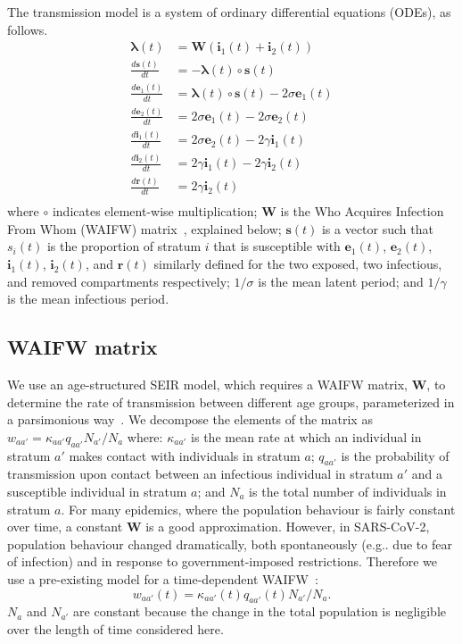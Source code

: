 \documentclass[9pt,twocolumn,twoside]{pnas-new}
\makeatletter
\newcommand\matr{\bm}
\renewcommand{\vec}[1]{\bm{#1}}
\DeclareRobustCommand\onedot{\futurelet\@let@token\@onedot}
\def\@onedot{\ifx\@let@token.\else.\null\fi\xspace}
\def\eg{e.g\onedot} \def\Eg{{E.g}\onedot}
\makeatother
\begin{document}
The transmission model is a system of ordinary differential equations (ODEs), as follows.
\begin{equation}
\begin{aligned}
    \vec{\lambda}(t) &= \matr{W} (\vec{i}_1(t) + \vec{i}_2(t)) \\
    \frac{d\vec{s}(t)}{dt} &= -\vec{\lambda}(t) \circ \vec{s}(t) \\
    \frac{d\vec{e}_1(t)}{dt} &= \vec{\lambda}(t) \circ \vec{s}(t) - 2\sigma \vec{e}_1(t) \\
    \frac{d\vec{e}_2(t)}{dt} &= 2\sigma \vec{e}_1(t) - 2\sigma \vec{e}_2(t) \\
    \frac{d\vec{i}_1(t)}{dt} &= 2\sigma \vec{e}_2(t) - 2\gamma \vec{i}_1(t) \\
    \frac{d\vec{i}_2(t)}{dt} &= 2\gamma \vec{i}_1(t) - 2\gamma \vec{i}_2(t) \\
    \frac{d\vec{r}(t)}{dt} &= 2\gamma \vec{i}_2(t) \\
\end{aligned}
\label{SEIR:eq:fullODEs}
\end{equation}
where $\circ$ indicates element-wise multiplication; $\matr{W}$ is the Who Acquires Infection From Whom (WAIFW) matrix~\citep{keelingModeling}, explained below; $\vec{s}(t)$ is a vector such that $s_{i}(t)$ is the proportion of stratum $i$ that is susceptible with $\vec{e}_1(t)$, $\vec{e}_2(t)$, $\vec{i}_1(t)$, $\vec{i}_2(t)$, and $\vec{r}(t)$ similarly defined for the two exposed, two infectious, and removed compartments respectively; $1/\sigma$ is the mean latent period; and $1/\gamma$ is the mean infectious period.


\subsection*{WAIFW matrix} \label{SEIR:sec:WAIFW-application}

We use an age-structured SEIR model, which requires a WAIFW matrix, $\matr{W}$, to determine the rate of transmission between different age groups, parameterized in a parsimonious way~\citep{andersonInfectious,keelingModeling}.
We decompose the elements of the matrix as $w_{aa'} = \kappa_{aa'} q_{aa'} N_{a'} / N_{a}$ where: $\kappa_{aa'}$ is the mean rate at which an individual in stratum $a'$ makes contact with individuals in stratum $a$; $q_{aa'}$ is the probability of transmission upon contact between an infectious individual in stratum $a'$ and a susceptible individual in stratum $a$; and $N_{a}$ is the total number of individuals in stratum $a$.
For many epidemics, where the population behaviour is fairly constant over time, a constant $\matr{W}$ is a good approximation.
However, in SARS-CoV-2, population behaviour changed dramatically, both spontaneously (\eg due to fear of infection) and in response to government-imposed restrictions.
Therefore we use a pre-existing model for a time-dependent WAIFW~\citep{birrellRealtime}:
\begin{equation}
    w_{aa'}(t) = \kappa_{aa'}(t) q_{aa'}(t) N_{a'} / N_a.
\end{equation}
$N_a$ and $N_{a'}$ are constant because the change in the total population is negligible over the length of time considered here.
\end{document}
